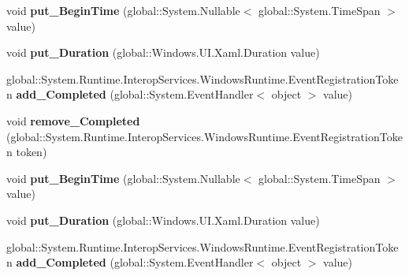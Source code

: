\begin{DoxyCompactItemize}
void {\bfseries put\+\_\+\+Begin\+Time} (global\+::\+System.\+Nullable$<$ global\+::\+System.\+Time\+Span $>$ value)
\item 
\mbox{\label{interface_windows_1_1_u_i_1_1_xaml_1_1_media_1_1_animation_1_1_i_timeline_aa1793004fef03b01c0341256ede164d9}} 
void {\bfseries put\+\_\+\+Duration} (global\+::\+Windows.\+U\+I.\+Xaml.\+Duration value)
\item 
\mbox{\label{interface_windows_1_1_u_i_1_1_xaml_1_1_media_1_1_animation_1_1_i_timeline_a7ee61c5d3a53c5f8570e743522b52866}} 
global\+::\+System.\+Runtime.\+Interop\+Services.\+Windows\+Runtime.\+Event\+Registration\+Token {\bfseries add\+\_\+\+Completed} (global\+::\+System.\+Event\+Handler$<$ object $>$ value)
\item 
\mbox{\label{interface_windows_1_1_u_i_1_1_xaml_1_1_media_1_1_animation_1_1_i_timeline_a633d5239301849202b3e61b320bed13b}} 
void {\bfseries remove\+\_\+\+Completed} (global\+::\+System.\+Runtime.\+Interop\+Services.\+Windows\+Runtime.\+Event\+Registration\+Token token)
\item 
\mbox{\label{interface_windows_1_1_u_i_1_1_xaml_1_1_media_1_1_animation_1_1_i_timeline_ad171463dc00462d1c1841261c8e10d1e}} 
void {\bfseries put\+\_\+\+Begin\+Time} (global\+::\+System.\+Nullable$<$ global\+::\+System.\+Time\+Span $>$ value)
\item 
\mbox{\label{interface_windows_1_1_u_i_1_1_xaml_1_1_media_1_1_animation_1_1_i_timeline_aa1793004fef03b01c0341256ede164d9}} 
void {\bfseries put\+\_\+\+Duration} (global\+::\+Windows.\+U\+I.\+Xaml.\+Duration value)
\item 
\mbox{\label{interface_windows_1_1_u_i_1_1_xaml_1_1_media_1_1_animation_1_1_i_timeline_a7ee61c5d3a53c5f8570e743522b52866}} 
global\+::\+System.\+Runtime.\+Interop\+Services.\+Windows\+Runtime.\+Event\+Registration\+Token {\bfseries add\+\_\+\+Completed} (global\+::\+System.\+Event\+Handler$<$ object $>$ value)

\end{DoxyCompactItemize}
